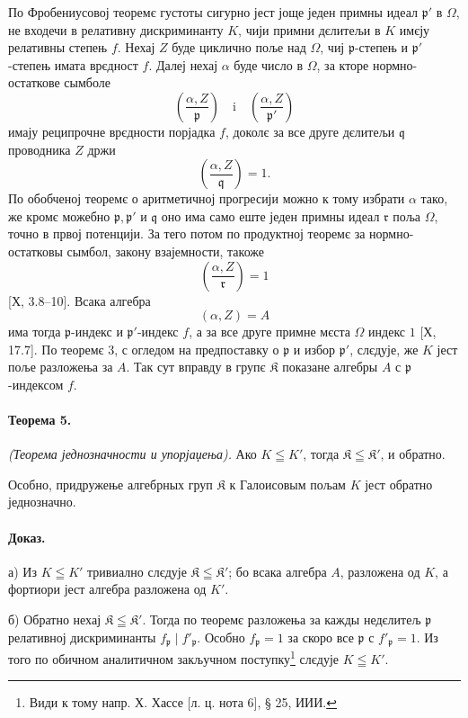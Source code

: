 \documentclass[11pt]{article}
\begin{document}
По Фробениусовој теоремє густоты сигурно јест јоще једен примны идеал \(\mathfrak p'\) в \(\Omega\), не входечи в релативну дискриминанту \(K\), чији примни дєлитељи в \(K\) имєју релативны степењ \(f\). Нехај \(Z\) буде циклично поље над \(\Omega\), чиј \( \mathfrak p\)-степењ и \( \mathfrak p'\)-степењ имата врєдност \(f\). Далеј нехај \(\alpha\) буде число в \(\Omega\), за кторе нормно-остаткове сымболе
\[
\left(\frac{\alpha,Z}{\mathfrak p}\right)\quad\text{i}\quad
\left(\frac{\alpha,Z}{\mathfrak p'}\right)
\]
имају реципрочне врєдности порјадка \(f\), доколє за все друге дєлитељи \(\mathfrak q\) проводника \(Z\) држи
\[
\left(\frac{\alpha,Z}{\mathfrak q}\right)=1.
\]
По обобченој теоремє о аритметичној прогресији можно к тому избрати \(\alpha\) тако, же кромє можебно \(\mathfrak p,\mathfrak p'\) и \(\mathfrak q\) оно има само еште једен примны идеал \(\mathfrak r\) поља \(\Omega\), точно в првој потенцији. За тего потом по продуктној теоремє за нормно-остатковы сымбол, закону взајемности, такоже
\[
\left(\frac{\alpha,Z}{\mathfrak r}\right)=1
\]
[Х, 3.8--10]. Всака алгебра
\[
        (\alpha,Z)=A
\]
има тогда \( \mathfrak p\)-индекс и \( \mathfrak p'\)-индекс \(f\), а за все друге примне мєста \(\Omega\) индекс \(1\) [Х, 17.7]. По теоремє 3, с огледом на предпоставку о \(\mathfrak p\) и избор \(\mathfrak p'\), слєдује, же \(K\) јест поље разложења за \(A\). Так сут вправду в групє \(\mathfrak K\) показане алгебры \(A\) с \( \mathfrak p\)-индексом \(f\).

\paragraph{Теорема 5.}
\emph{(Теорема једнозначности и упорјаџења).} Ако \(K\leqq K'\), тогда \(\mathfrak K\leqq\mathfrak K'\), и обратно.

Особно, придружење алгебрных груп \(\mathfrak K\) к Галоисовым пољам \(K\) јест обратно једнозначно.

\paragraph{Доказ.}
а) Из \(K\leqq K'\) тривиално слєдује \(\mathfrak K\leqq\mathfrak K'\); бо всака алгебра \(A\), разложена од \(K\), а фортиори јест алгебра разложена од \(K'\).

б) Обратно нехај \(\mathfrak K\leqq\mathfrak K'\). Тогда по теоремє разложења за кажды недєлитељ \(\mathfrak p\) релативној дискриминанты \(f_{\mathfrak p}\mid f'_{\mathfrak p}\). Особно \(f_{\mathfrak p}=1\) за скоро все \(\mathfrak p\) с \(f'_{\mathfrak p}=1\). Из того по обичном аналитичном закључном поступку\footnote{Види к тому напр. Х. Хассе [л. ц. нота 6], § 25, ИИИ.} слєдује \(K\leqq K'\).
\end{document}

